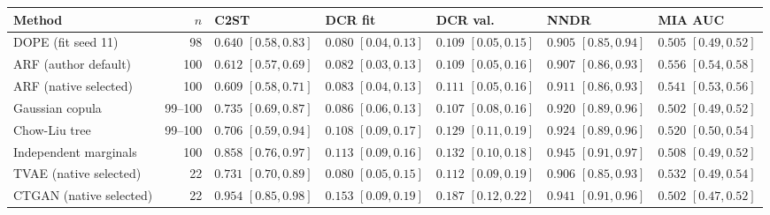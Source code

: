 \begin{tabular}{@{}lrlllll@{}}
\toprule
Method & $n$ & C2ST & DCR fit & DCR val. & NNDR & MIA AUC \\
\midrule
DOPE (fit seed 11) & 98 & $0.640$ \scriptsize$[0.58,0.83]$ & $0.080$ \scriptsize$[0.04,0.13]$ & $0.109$ \scriptsize$[0.05,0.15]$ & $0.905$ \scriptsize$[0.85,0.94]$ & $0.505$ \scriptsize$[0.49,0.52]$ \\
ARF (author default) & 100 & $0.612$ \scriptsize$[0.57,0.69]$ & $0.082$ \scriptsize$[0.03,0.13]$ & $0.109$ \scriptsize$[0.05,0.16]$ & $0.907$ \scriptsize$[0.86,0.93]$ & $0.556$ \scriptsize$[0.54,0.58]$ \\
ARF (native selected) & 100 & $0.609$ \scriptsize$[0.58,0.71]$ & $0.083$ \scriptsize$[0.04,0.13]$ & $0.111$ \scriptsize$[0.05,0.16]$ & $0.911$ \scriptsize$[0.86,0.93]$ & $0.541$ \scriptsize$[0.53,0.56]$ \\
Gaussian copula & 99--100 & $0.735$ \scriptsize$[0.69,0.87]$ & $0.086$ \scriptsize$[0.06,0.13]$ & $0.107$ \scriptsize$[0.08,0.16]$ & $0.920$ \scriptsize$[0.89,0.96]$ & $0.502$ \scriptsize$[0.49,0.52]$ \\
Chow-Liu tree & 99--100 & $0.706$ \scriptsize$[0.59,0.94]$ & $0.108$ \scriptsize$[0.09,0.17]$ & $0.129$ \scriptsize$[0.11,0.19]$ & $0.924$ \scriptsize$[0.89,0.96]$ & $0.520$ \scriptsize$[0.50,0.54]$ \\
Independent marginals & 100 & $0.858$ \scriptsize$[0.76,0.97]$ & $0.113$ \scriptsize$[0.09,0.16]$ & $0.132$ \scriptsize$[0.10,0.18]$ & $0.945$ \scriptsize$[0.91,0.97]$ & $0.508$ \scriptsize$[0.49,0.52]$ \\
TVAE (native selected) & 22 & $0.731$ \scriptsize$[0.70,0.89]$ & $0.080$ \scriptsize$[0.05,0.15]$ & $0.112$ \scriptsize$[0.09,0.19]$ & $0.906$ \scriptsize$[0.85,0.93]$ & $0.532$ \scriptsize$[0.49,0.54]$ \\
CTGAN (native selected) & 22 & $0.954$ \scriptsize$[0.85,0.98]$ & $0.153$ \scriptsize$[0.09,0.19]$ & $0.187$ \scriptsize$[0.12,0.22]$ & $0.941$ \scriptsize$[0.91,0.96]$ & $0.502$ \scriptsize$[0.47,0.52]$ \\
\bottomrule
\end{tabular}
